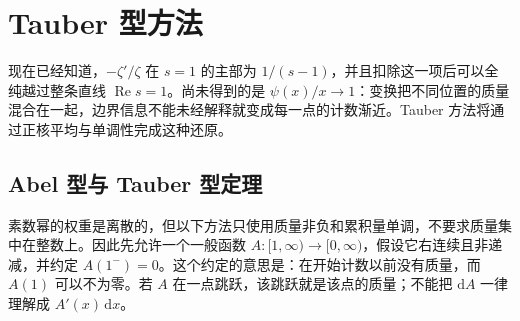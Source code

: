 \section{Tauber 型方法}
\label{b3:sec:2704}

现在已经知道，\(-\zeta'/\zeta\) 在 \(s=1\) 的主部为 \(1/(s-1)\)，并且扣除这一项后可以全纯越过整条直线 \(\operatorname{Re}s=1\)。尚未得到的是 \(\psi(x)/x\to1\)：变换把不同位置的质量混合在一起，边界信息不能未经解释就变成每一点的计数渐近。Tauber 方法将通过正核平均与单调性完成这种还原。

\subsection{Abel 型与 Tauber 型定理}
\label{b3:subsec:270401}

素数幂的权重是离散的，但以下方法只使用质量非负和累积量单调，不要求质量集中在整数上。因此先允许一个一般函数 \(A:[1,\infty)\to[0,\infty)\)，假设它右连续且非递减，并约定 \(A(1^-)=0\)。这个约定的意思是：在开始计数以前没有质量，而 \(A(1)\) 可以不为零。若 \(A\) 在一点跳跃，该跳跃就是该点的质量；不能把 \(\mathrm dA\) 一律理解成 \(A'(x)\,\mathrm dx\)。

